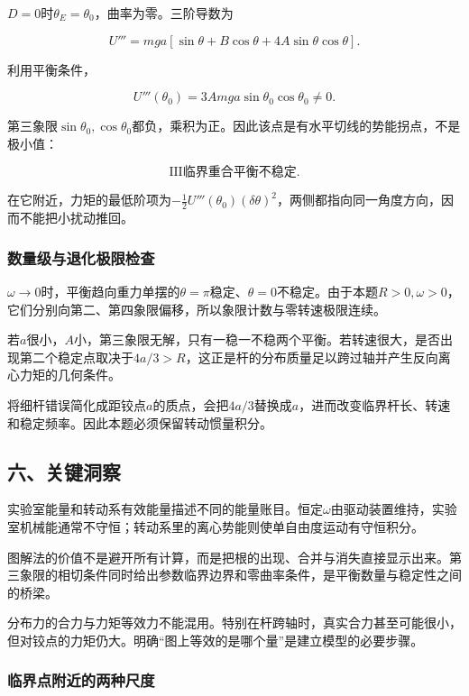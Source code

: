 \documentclass[12pt,a4paper,fontset=fandol]{ctexart}
\begin{document}
\(D=0\)时\(\theta_E=\theta_0\)，曲率为零。三阶导数为

\[
U'''=mga[\sin\theta+B\cos\theta+4A\sin\theta\cos\theta].
\]

利用平衡条件，

\[
U'''(\theta_0)
=3Amga\sin\theta_0\cos\theta_0\neq0.
\]

第三象限\(\sin\theta_0,\cos\theta_0\)都负，乘积为正。因此该点是有水平切线的势能拐点，不是极小值：

\[
\boxed{\mathrm{III}\text{临界重合平衡不稳定}}.
\]

在它附近，力矩的最低阶项为\(-\tfrac12U'''(\theta_0)(\delta\theta)^2\)，两侧都指向同一角度方向，因而不能把小扰动推回。

\subsubsection{数量级与退化极限检查}\label{ux6570ux91cfux7ea7ux4e0eux9000ux5316ux6781ux9650ux68c0ux67e5}

\(\omega\to0\)时，平衡趋向重力单摆的\(\theta=\pi\)稳定、\(\theta=0\)不稳定。由于本题\(R>0,\omega>0\)，它们分别向第二、第四象限偏移，所以象限计数与零转速极限连续。

若\(a\)很小，\(A\)小，第三象限无解，只有一稳一不稳两个平衡。若转速很大，是否出现第二个稳定点取决于\(4a/3>R\)，这正是杆的分布质量足以跨过轴并产生反向离心力矩的几何条件。

将细杆错误简化成距铰点\(a\)的质点，会把\(4a/3\)替换成\(a\)，进而改变临界杆长、转速和稳定频率。因此本题必须保留转动惯量积分。

\subsection{六、关键洞察}\label{ux516dux5173ux952eux6d1eux5bdf-3}

实验室能量和转动系有效能量描述不同的能量账目。恒定\(\omega\)由驱动装置维持，实验室机械能通常不守恒；转动系里的离心势能则使单自由度运动有守恒积分。

图解法的价值不是避开所有计算，而是把根的出现、合并与消失直接显示出来。第三象限的相切条件同时给出参数临界边界和零曲率条件，是平衡数量与稳定性之间的桥梁。

分布力的合力与力矩等效力不能混用。特别在杆跨轴时，真实合力甚至可能很小，但对铰点的力矩仍大。明确``图上等效的是哪个量''是建立模型的必要步骤。

\subsubsection{临界点附近的两种尺度}\label{ux4e34ux754cux70b9ux9644ux8fd1ux7684ux4e24ux79cdux5c3aux5ea6}
\end{document}
